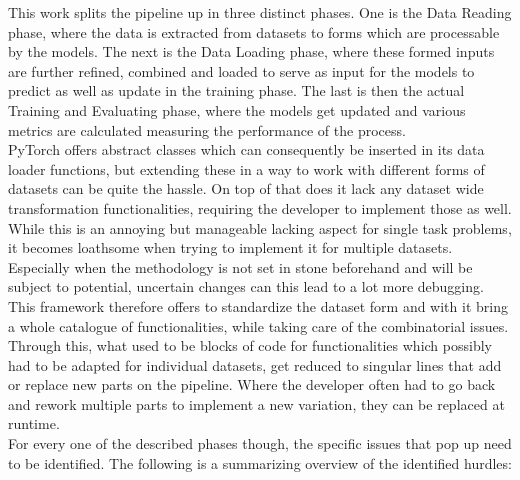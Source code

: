 This work splits the pipeline up in three distinct phases. One is the Data Reading phase, where the data is extracted from datasets to forms which are processable by the models. The next is the Data Loading phase, where these formed inputs are further refined, combined and loaded to serve as input for the models to predict as well as update in the training phase. The last is then the actual Training and Evaluating phase, where the models get updated and various metrics are calculated measuring the performance of the process.\\

PyTorch offers abstract classes which can consequently be inserted in its data loader functions, but extending these in a way to work with different forms of datasets can be quite the hassle. On top of that does it lack any dataset wide transformation functionalities, requiring the developer to implement those as well. While this is an annoying but manageable lacking aspect for single task problems, it becomes loathsome when trying to implement it for multiple datasets. Especially when the methodology is not set in stone beforehand and will be subject to potential, uncertain changes can this lead to a lot more debugging.\\

This framework therefore offers to standardize the dataset form and with it bring a whole catalogue of functionalities, while taking care of the combinatorial issues. Through this, what used to be blocks of code for functionalities which possibly had to be adapted for individual datasets, get reduced to singular lines that add or replace new parts on the pipeline. Where the developer often had to go back and rework multiple parts to implement a new variation, they can be replaced at runtime.\\

For every one of the described phases though, the specific issues that pop up need to be identified. The following is a summarizing overview of the identified hurdles:

